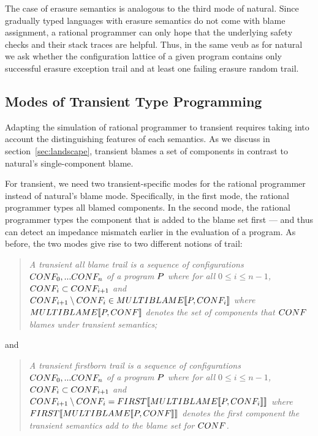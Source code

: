 The case of erasure semantics is analogous to the third mode of natural.  Since
gradually typed languages with erasure semantics do not come with blame
assignment, a rational programmer can only hope that the underlying safety
checks and their stack traces are helpful.  Thus, in the same veub as for
natural we ask whether the configuration lattice of a given program contains
only successful erasure exception trail and at least one failing erasure random
trail. 

\subsection{Modes of Transient Type Programming} \label{sub:transient}

Adapting the simulation of rational programmer to transient
requires taking into account the distinguishing
features of each semantics. As we discuss in section~\ref{sec:landscape}, 
transient blames a set of components in contrast to natural's
single-component blame. 

For transient, we 
need two transient-specific modes for the rational
programmer instead of natural's blame mode. Specifically, in the first mode, the rational programmer types
all blamed components.  In the second mode, the rational programmer types
the component that is added to the blame set first --- and thus can 
detect an impedance mismatch earlier in the evaluation of a program. 
As before, the two modes give
rise to two different notions of trail:
\begin{quote}
\it 
A  transient all blame trail
is a sequence of configurations $CONF_0,...CONF_n$ of a program
$P$ where for all $0 \leq i \leq n - 1$, $CONF_i \subset CONF_{i+1}$ and
~$CONF_{i+1} \setminus CONF_i \in MULTIBLAME\llbracket P, CONF_i\rrbracket$
where $MULTIBLAME\llbracket P, CONF\rrbracket$ denotes the set of components that $CONF$
blames under transient semantics; 
\end{quote}
\noindent
and
\begin{quote}
\it 
A transient firstborn  trail
is a sequence of configurations $CONF_0,...CONF_n$ of a program
$P$ where for all $0 \leq i \leq n - 1$, $CONF_i \subset CONF_{i+1}$ and
  $CONF_{i+1} \setminus CONF_i = FIRST\llbracket MULTIBLAME\llbracket P, CONF_i\rrbracket\rrbracket$
  where $FIRST\llbracket MULTIBLAME\llbracket P, CONF\rrbracket\rrbracket$ denotes the first component 
  the transient semantics add to the blame set for $CONF$.
\end{quote}


